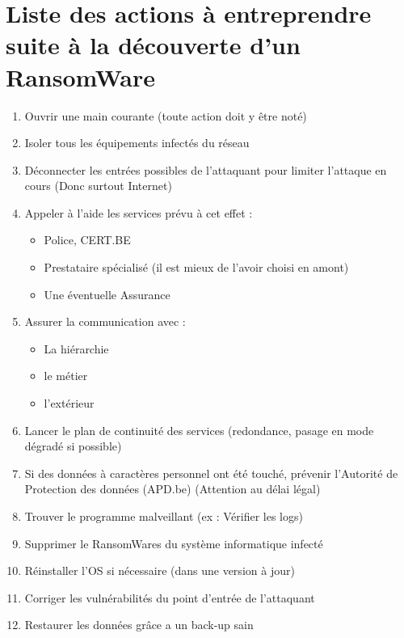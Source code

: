 \documentclass[a4paper]{article}
\begin{document}
  \section{Liste des actions à entreprendre suite à la découverte d'un RansomWare}
  \begin{enumerate}
    \item Ouvrir une main courante (toute action doit y être noté)
    \item Isoler tous les équipements infectés du réseau
    \item Déconnecter les entrées possibles de l'attaquant pour limiter l'attaque en cours (Donc surtout Internet)
    \item Appeler à l'aide les services prévu à cet effet :
    \begin{itemize}[label=, font=\scriptsize]
      \item Police, CERT.BE
      \item Prestataire spécialisé (il est mieux de l'avoir choisi en amont)
      \item Une éventuelle Assurance
    \end{itemize}
    \item Assurer la communication avec :
    \begin{itemize}[label=, font=\scriptsize]
      \item La hiérarchie
      \item le métier
      \item l'extérieur
    \end{itemize}
    \item Lancer le plan de continuité des services (redondance, pasage en mode dégradé si possible)
    \item Si des données à caractères personnel ont été touché, prévenir l'Autorité de Protection des données (APD.be) (Attention au délai légal)
    \item Trouver le programme malveillant (ex : Vérifier les logs)
    \item Supprimer le RansomWares du système informatique infecté
    \item Réinstaller l'OS si nécessaire (dans une version à jour)
    \item Corriger les vulnérabilités du point d'entrée de l'attaquant
    \item Restaurer les données grâce a un back-up sain
  \end{enumerate}
\end{document}
